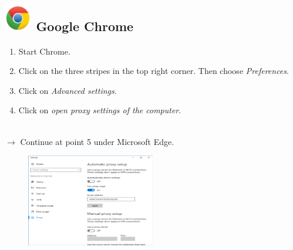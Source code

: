 \documentclass[a4paper,12pt]{scrartcl}
\begin{document}
\subsection*{\includegraphics[height=1.2cm,keepaspectratio]{Bilder/Chrome_2011_logo} Google Chrome}
\begin{enumerate}
	\item Start Chrome.
	\item Click on the three stripes in the top right corner. Then choose \emph{Preferences}.
	\item Click on \emph{Advanced settings}.
	\item Click on \emph{open proxy settings of the computer}.
	\\
	\\
\end{enumerate}
$\rightarrow$ Continue at point 5 under Microsoft Edge.

\newpage
\begin{figure}
	\begin{center}
		\includegraphics[width=0.5\textwidth,keepaspectratio]{Bilder/Proxy_Edge_EN}
	\end{center}
\end{figure}

\end{document}
